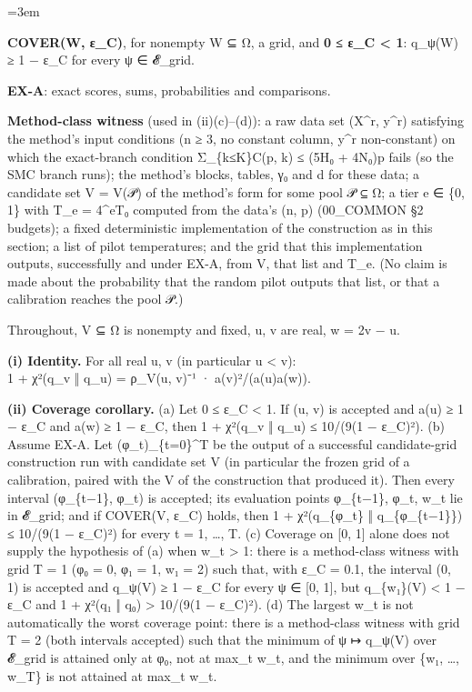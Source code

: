 \documentclass[11pt]{report}
\newenvironment{mdblock}{\begingroup\mdfont\raggedright\setlength{\parindent}{0pt}\setlength{\parskip}{0.55em}\emergencystretch=3em}{\par\endgroup}
\newcommand{\mdhead}[2]{\par\vspace{0.7em}\noindent{\bfseries\ifcase#1\or\large\or\normalsize\or\normalsize\or\small\or\small\or\small\fi #2}\par\nopagebreak\vspace{0.1em}}
\begin{document}
\begin{mdblock}
\begin{mdbul}
\item \textbf{COVER(W, ε\_C)}, for nonempty W ⊆ Ω, a grid, and \textbf{0 ≤ ε\_C < 1}: q\_ψ(W) ≥ 1 − ε\_C for every ψ ∈ 𝓔\_grid.
\item \textbf{EX-A}: exact scores, sums, probabilities and comparisons.
\item \textbf{Method-class witness} (used in (ii)(c)–(d)): a raw data set (X\textasciicircum{}r, y\textasciicircum{}r) satisfying the method's input conditions (n ≥ 3, no constant column, y\textasciicircum{}r non-constant) on which the exact-branch condition Σ\_\{k≤K\}C(p, k) ≤ (5H₀ + 4N₀)p fails (so the SMC branch runs); the method's blocks, tables, γ₀ and d for these data; a candidate set V = V(𝒫) of the method's form for some pool 𝒫 ⊆ Ω; a tier e ∈ \{0, 1\} with T\_e = 4\textasciicircum{}eT₀ computed from the data's (n, p) (00\_COMMON §2 budgets); a fixed deterministic implementation of the construction as in this section; a list of pilot temperatures; and the grid that this implementation outputs, successfully and under EX-A, from V, that list and T\_e. (No claim is made about the probability that the random pilot outputs that list, or that a calibration reaches the pool 𝒫.)
\end{mdbul}

\mdhead{2}{1. Statement}

Throughout, V ⊆ Ω is nonempty and fixed, u, v are real, w = 2v − u.

\textbf{(i) Identity.} For all real u, v (in particular u < v):\\
\hspace*{1.5em}1 + χ²(q\_v ‖ q\_u) = ρ\_V(u, v)⁻¹ · a(v)²/(a(u)a(w)).

\textbf{(ii) Coverage corollary.} (a) Let 0 ≤ ε\_C < 1. If (u, v) is accepted and a(u) ≥ 1 − ε\_C and a(w) ≥ 1 − ε\_C, then 1 + χ²(q\_v ‖ q\_u) ≤ 10/(9(1 − ε\_C)²). (b) Assume EX-A. Let (φ\_t)\_\{t=0\}\textasciicircum{}T be the output of a successful candidate-grid construction run with candidate set V (in particular the frozen grid of a calibration, paired with the V of the construction that produced it). Then every interval (φ\_\{t−1\}, φ\_t) is accepted; its evaluation points φ\_\{t−1\}, φ\_t, w\_t lie in 𝓔\_grid; and if COVER(V, ε\_C) holds, then 1 + χ²(q\_\{φ\_t\} ‖ q\_\{φ\_\{t−1\}\}) ≤ 10/(9(1 − ε\_C)²) for every t = 1, …, T. (c) Coverage on [0, 1] alone does not supply the hypothesis of (a) when w\_t > 1: there is a method-class witness with grid T = 1 (φ₀ = 0, φ₁ = 1, w₁ = 2) such that, with ε\_C = 0.1, the interval (0, 1) is accepted and q\_ψ(V) ≥ 1 − ε\_C for every ψ ∈ [0, 1], but q\_\{w₁\}(V) < 1 − ε\_C and 1 + χ²(q₁ ‖ q₀) > 10/(9(1 − ε\_C)²). (d) The largest w\_t is not automatically the worst coverage point: there is a method-class witness with grid T = 2 (both intervals accepted) such that the minimum of ψ ↦ q\_ψ(V) over 𝓔\_grid is attained only at φ₀, not at max\_t w\_t, and the minimum over \{w₁, …, w\_T\} is not attained at max\_t w\_t.


\end{mdblock}
\end{document}
